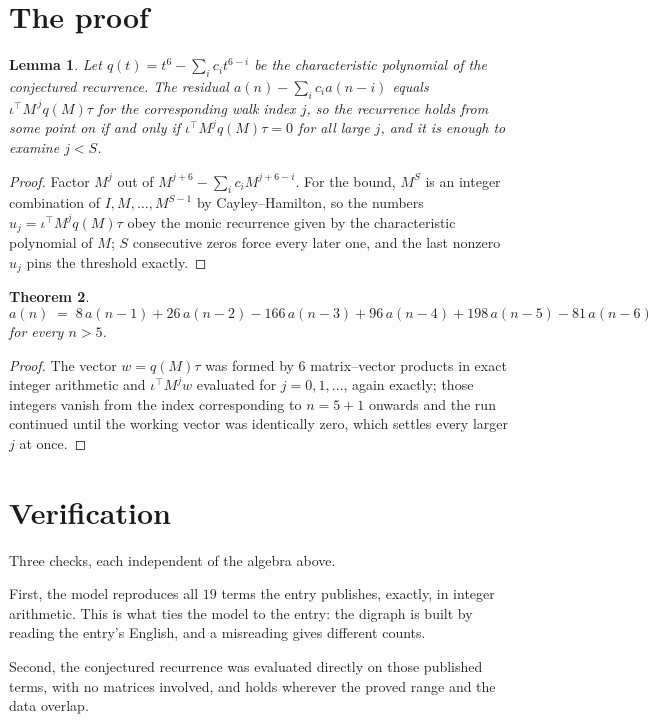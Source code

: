 \documentclass[11pt,a4paper]{article}
\theoremstyle{plain}
\newtheorem{theorem}{Theorem}
\newtheorem{lemma}[theorem]{Lemma}
\theoremstyle{definition}
\begin{document}
\section{The proof}

\begin{lemma}\label{lem:crit}
Let $q(t)=t^{6}-\sum_i c_it^{6-i}$ be the characteristic polynomial of the
conjectured recurrence. The residual $a(n)-\sum_ic_ia(n-i)$ equals
$\iota^{\!\top}M^{\,j}q(M)\tau$ for the corresponding walk index $j$, so the recurrence
holds from some point on if and only if $\iota^{\!\top}M^{j}q(M)\tau=0$ for all large $j$,
and it is enough to examine $j<S$.
\end{lemma}

\begin{proof}
Factor $M^{j}$ out of $M^{j+6}-\sum_ic_iM^{j+6-i}$. For the bound, $M^{S}$
is an integer combination of $I,M,\dots,M^{S-1}$ by Cayley--Hamilton, so the numbers
$u_j=\iota^{\!\top}M^{j}q(M)\tau$ obey the monic recurrence given by the characteristic
polynomial of $M$; $S$ consecutive zeros force every later one, and the last nonzero $u_j$
pins the threshold exactly.
\end{proof}

\begin{theorem}
\[
a(n)\;=\;8\,a(n-1) + 26\,a(n-2) - 166\,a(n-3) + 96\,a(n-4) + 198\,a(n-5) - 81\,a(n-6)
\]
for every $n>5$.
\end{theorem}

\begin{proof}
The vector $w=q(M)\tau$ was formed by $6$ matrix--vector products in exact integer
arithmetic and $\iota^{\!\top}M^{j}w$ evaluated for $j=0,1,\dots$, again exactly; those
integers vanish from the index corresponding to $n=5+1$ onwards and the run continued
until the working vector was identically zero, which settles every larger $j$ at once.
\end{proof}

\section{Verification}

Three checks, each independent of the algebra above.

First, the model reproduces all $19$ terms the entry publishes, exactly, in integer
arithmetic. This is what ties the model to the entry: the digraph is built by reading the
entry's English, and a misreading gives different counts.

Second, the conjectured recurrence was evaluated directly on those published terms, with no
matrices involved, and holds wherever the proved range and the data overlap.
\end{document}
